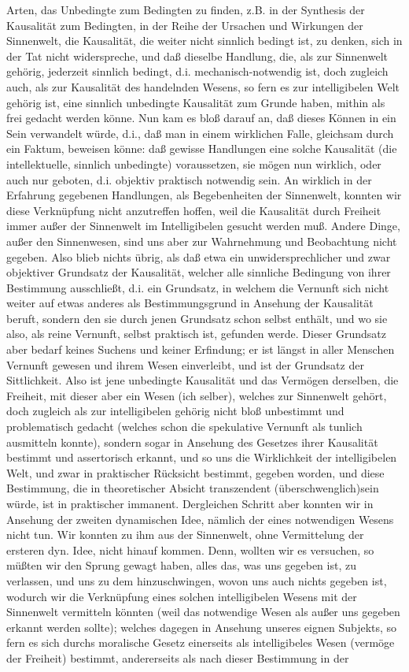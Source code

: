 \documentclass[a4paper,12pt,twoside]{book}
\begin{document}
Arten, das Unbedingte zum Bedingten zu finden, z.B. in der Synthesis der Kausalität zum Bedingten, in der Reihe der Ursachen und Wirkungen der Sinnenwelt, die Kausalität, die weiter nicht sinnlich bedingt ist, zu denken, sich in der Tat nicht widerspreche, und daß dieselbe Handlung, die, als zur Sinnenwelt gehörig, jederzeit sinnlich bedingt, d.i. mechanisch-notwendig ist, doch zugleich auch, als zur Kausalität des handelnden Wesens, so fern es zur intelligibelen Welt gehörig ist, eine sinnlich unbedingte Kausalität zum Grunde haben, mithin als frei gedacht werden könne. Nun kam es bloß darauf an, daß dieses Können in ein Sein verwandelt würde, d.i., daß man in einem wirklichen Falle, gleichsam durch ein Faktum, beweisen könne: daß gewisse Handlungen eine solche Kausalität (die intellektuelle, sinnlich unbedingte) voraussetzen, sie mögen nun wirklich, oder auch nur geboten, d.i. objektiv praktisch notwendig sein. An wirklich in der Erfahrung  gegebenen Handlungen, als Begebenheiten der Sinnenwelt, konnten wir diese Verknüpfung nicht anzutreffen hoffen, weil die Kausalität durch Freiheit immer außer der Sinnenwelt im Intelligibelen gesucht werden muß. Andere Dinge, außer den Sinnenwesen, sind uns aber zur Wahrnehmung und Beobachtung nicht gegeben. Also blieb nichts übrig, als daß etwa ein unwidersprechlicher und zwar objektiver Grundsatz der Kausalität, welcher alle sinnliche Bedingung von ihrer Bestimmung ausschließt, d.i. ein Grundsatz, in welchem die Vernunft sich nicht weiter auf etwas anderes als Bestimmungsgrund in Ansehung der Kausalität beruft, sondern den sie durch jenen Grundsatz schon selbst enthält, und wo sie also, als reine Vernunft, selbst praktisch ist, gefunden werde. Dieser Grundsatz aber bedarf keines Suchens und keiner Erfindung; er ist längst in aller Menschen Vernunft gewesen und ihrem Wesen einverleibt, und ist der Grundsatz der Sittlichkeit. Also ist jene unbedingte Kausalität und das Vermögen derselben, die Freiheit, mit dieser aber ein Wesen (ich selber), welches zur Sinnenwelt gehört, doch zugleich als zur intelligibelen gehörig nicht bloß unbestimmt und problematisch gedacht (welches schon die spekulative Vernunft als tunlich ausmitteln konnte), sondern sogar in Ansehung des Gesetzes ihrer Kausalität bestimmt und assertorisch erkannt, und so uns die Wirklichkeit der intelligibelen Welt, und zwar in praktischer Rücksicht bestimmt, gegeben worden, und diese Bestimmung, die in theoretischer Absicht transzendent (überschwenglich)sein würde, ist in praktischer immanent. Dergleichen Schritt aber konnten wir in Ansehung der zweiten dynamischen Idee, nämlich der eines notwendigen Wesens nicht tun. Wir konnten zu ihm aus der Sinnenwelt, ohne Vermittelung der ersteren dyn. Idee, nicht hinauf kommen. Denn, wollten wir es versuchen, so müßten wir den Sprung gewagt haben, alles das, was uns gegeben ist, zu verlassen, und uns zu dem hinzuschwingen, wovon uns auch nichts gegeben ist, wodurch wir die Verknüpfung eines solchen intelligibelen Wesens mit der Sinnenwelt vermitteln könnten (weil das notwendige Wesen als außer uns gegeben  erkannt werden sollte); welches dagegen in Ansehung unseres eignen Subjekts, so fern es sich durchs moralische Gesetz einerseits als intelligibeles Wesen (vermöge der Freiheit) bestimmt, andererseits als nach dieser Bestimmung in der 
\end{document}
